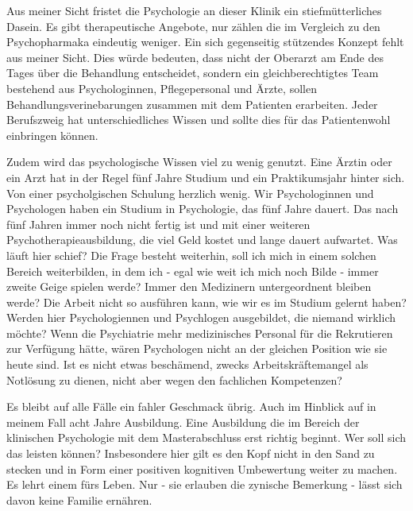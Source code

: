 \documentclass[jou,apacite]{apa6}
\begin{document}
Aus meiner Sicht fristet die Psychologie an dieser Klinik ein stiefmütterliches Dasein. Es gibt therapeutische Angebote, nur zählen die im Vergleich zu den Psychopharmaka eindeutig weniger. Ein sich gegenseitig stützendes Konzept fehlt aus meiner Sicht. Dies würde bedeuten, dass nicht der Oberarzt am Ende des Tages über die Behandlung entscheidet, sondern ein gleichberechtigtes Team bestehend aus Psychologinnen, Pflegepersonal und Ärzte, sollen Behandlungsverinebarungen zusammen mit dem Patienten erarbeiten. Jeder Berufszweig hat unterschiedliches Wissen und sollte dies für das Patientenwohl einbringen können. 

Zudem wird das psychologische Wissen viel zu wenig genutzt. Eine Ärztin oder ein Arzt hat in der Regel fünf Jahre Studium und ein Praktikumsjahr hinter sich. Von einer psycholgischen Schulung herzlich wenig. Wir Psychologinnen und Psychologen haben ein Studium in Psychologie, das fünf Jahre dauert. Das nach fünf Jahren immer noch nicht fertig ist und mit einer weiteren Psychotherapieausbildung, die viel Geld kostet und lange dauert aufwartet. Was läuft hier schief? Die Frage besteht weiterhin, soll ich mich in einem solchen Bereich weiterbilden, in dem ich - egal wie weit ich mich noch Bilde - immer zweite Geige spielen werde? Immer den Medizinern untergeordnent bleiben werde? Die Arbeit nicht so ausführen kann, wie wir es im Studium gelernt haben? Werden hier Psychologiennen und Psychlogen ausgebildet, die niemand wirklich möchte? Wenn die Psychiatrie mehr medizinisches Personal für die Rekrutieren zur Verfügung hätte, wären Psychologen nicht an der gleichen Position wie sie heute sind. Ist es nicht etwas beschämend, zwecks Arbeitskräftemangel als Notlösung zu dienen, nicht aber wegen den fachlichen Kompetenzen? 

Es bleibt auf alle Fälle ein fahler Geschmack übrig. Auch im Hinblick auf in meinem Fall acht Jahre Ausbildung. Eine Ausbildung die im Bereich der klinischen Psychologie mit dem Masterabschluss erst richtig beginnt. Wer soll sich das leisten können? Insbesondere hier gilt es den Kopf nicht in den Sand zu stecken und in Form einer positiven kognitiven Umbewertung weiter zu machen. Es lehrt einem fürs Leben. Nur - sie erlauben die zynische Bemerkung - lässt sich davon keine Familie ernähren.  
\end{document}
